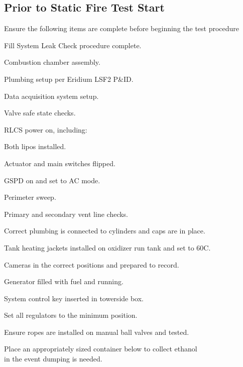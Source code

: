 \subsection{Prior to Static Fire Test Start}
\begin{checklist}
\item Ensure the following items are complete before beginning the test procedure
    \begin{checklist}
        \item Fill System Leak Check procedure complete.
        \item Combustion chamber assembly.
        \item Plumbing setup per Eridium LSF2 P\&ID. 
        \item Data acquisition system setup.
        \item Valve safe state checks.
        \item RLCS power on, including:
        \begin{checklist}
        \item Both lipos installed.
        \item Actuator and main switches flipped.
        \item GSPD on and set to AC mode.
        \end{checklist}
        \item Perimeter sweep. 
        \item Primary and secondary vent line checks.
        \item Correct plumbing is connected to cylinders and caps are in place.
        \item Tank heating jackets installed on oxidizer run tank and set to 60\textdegree C. 
        \item Cameras in the correct positions and prepared to record. 
        \item Generator filled with fuel and running. 
        \item System control key inserted in towerside box.
        \item Set all regulators to the minimum position. 
        \item Ensure ropes are installed on manual ball valves and tested.
        \item Place an appropriately sized container below \fdrain{} to collect ethanol \\ \phantom{} \hspace{8ex} in the event dumping is needed.

\end{checklist}
\end{checklist}
